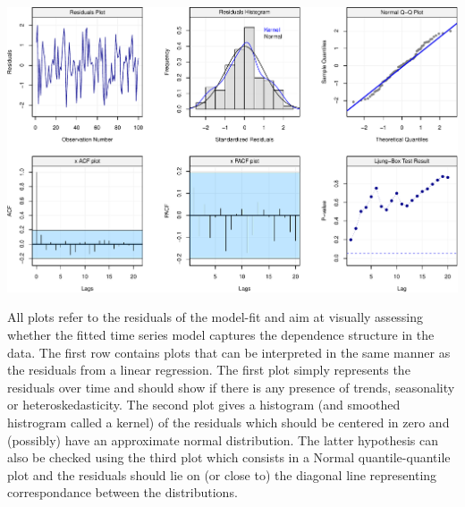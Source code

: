 \documentclass[]{book}
\theoremstyle{definition}
\theoremstyle{definition}
\theoremstyle{definition}
\theoremstyle{remark}
\begin{document}
\includegraphics{ts_files/figure-latex/diagnostic_plot-1.pdf}

All plots refer to the residuals of the model-fit and aim at visually
assessing whether the fitted time series model captures the dependence
structure in the data. The first row contains plots that can be
interpreted in the same manner as the residuals from a linear
regression. The first plot simply represents the residuals over time and
should show if there is any presence of trends, seasonality or
heteroskedasticity. The second plot gives a histogram (and smoothed
histrogram called a kernel) of the residuals which should be centered in
zero and (possibly) have an approximate normal distribution. The latter
hypothesis can also be checked using the third plot which consists in a
Normal quantile-quantile plot and the residuals should lie on (or close
to) the diagonal line representing correspondance between the
distributions.
\end{document}
